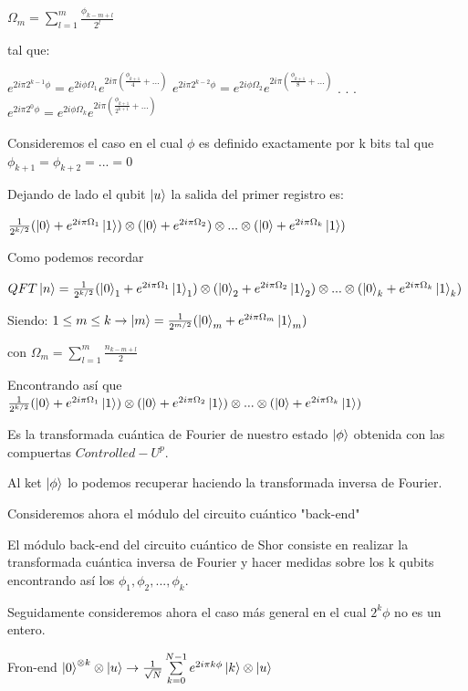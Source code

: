 \documentclass[11pt, spanish]{report}
\begin{document}
$\Omega_m = \sum\limits_{l=1}^m \frac{\phi_{k-m+l}}{2^l}$

tal que:

$e^{2 i \pi 2^{k-1} \phi} = e^{2 i \phi \Omega_1} e^{2 i \pi (\frac{\phi_{k+1}}{4} + ...)}$
$e^{2 i \pi 2^{k-2} \phi} = e^{2 i \phi \Omega_2} e^{2 i \pi (\frac{\phi_{k+1}}{8} + ...)}$
.
.
.
$e^{2 i \pi 2^0 \phi} = e^{2 i \phi \Omega_k} e^{2 i \pi (\frac{\phi_{k+1}}{2^{k+1}} + ...)}$

Consideremos el caso en el cual $\phi$ es definido exactamente por k bits tal que $\phi_{k+1} = \phi_{k+2} = ... = 0$

Dejando de lado el qubit $\ket{u}$ la salida del primer registro es:

$\frac{1}{2^{k/2}} (\ket{0} + e^{2 i \pi \Omega_1} \ket{1}) \otimes (\ket{0} + e^{2 i \pi \Omega_2}) \otimes ... \otimes (\ket{0} + e^{2 i \pi \Omega_k} \ket{1})$

Como podemos recordar

$QFT \ket{n} = \frac{1}{2^{k/2}} (\ket{0}_1 + e^{2 i \pi \Omega_1} \ket{1}_1) \otimes (\ket{0}_2 +  e^{2 i \pi \Omega_2} \ket{1}_2) \otimes ... \otimes (\ket{0}_k + e^{2 i \pi \Omega_k} \ket{1}_k)$

Siendo: $1 \leq m \leq k \rightarrow \ket{m} = \frac{1}{2^{m/2}} (\ket{0}_m + e^{2 i \pi \Omega_m} \ket{1}_m)$

con $\Omega_m = \sum\limits_{l=1}^m \frac{n_{k-m+l}}{2}$

Encontrando así que $\frac{1}{2^{k/2}} (\ket{0} + e^{2 i \pi \Omega_1} \ket{1}) \otimes (\ket{0} + e^{2 i \pi \Omega_2} \ket{1}) \otimes ... \otimes (\ket{0} + e^{2 i \pi \Omega_k} \ket{1})$

Es la transformada cuántica de Fourier de nuestro estado $\ket{\phi}$ obtenida con las compuertas $Controlled-U^p$.

Al ket $\ket{\phi}$ lo podemos recuperar haciendo la transformada inversa de Fourier.

Consideremos ahora el módulo del circuito cuántico "back-end"


El módulo back-end del circuito cuántico de Shor consiste en realizar la transformada cuántica inversa de Fourier y hacer medidas sobre los k qubits encontrando así los $\phi_1, \phi_2,...,\phi_k$.

Seguidamente consideremos ahora el caso más general en el cual $2^k \phi$ no es un entero.

Fron-end $\ket{0}^{\otimes k} \otimes \ket{u} \rightarrow \frac{1}{\sqrt{N}} \sum\limits_{k=0}^{N-1} e^{2 i \pi k \phi} \ket{k} \otimes \ket{u}$
\end{document}
